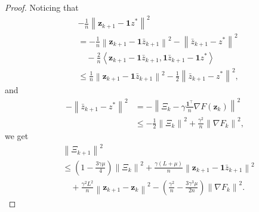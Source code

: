 \documentclass[letterpaper, 10 pt, conference]{ieeeconf}
\begin{document}
\begin{proof}
Noticing that 
\begin{equation*}
\begin{aligned}
&-\frac{1}{n}\left\| \mathbf{z}_{k+1}-\mathbf{1}z^* \right\| ^2
\\
&=-\frac{1}{n}\left\| \mathbf{z}_{k+1}-\mathbf{1}\bar{z}_{k+1} \right\| ^2-\left\| \bar{z}_{k+1}-z^* \right\| ^2
\\
&\quad -\frac{2}{n}\left< \mathbf{z}_{k+1}-\mathbf{1}\bar{z}_{k+1},\mathbf{1}\bar{z}_{k+1}-\mathbf{1}z^* \right> 
\\
&\leqslant \frac{1}{n}\left\| \mathbf{z}_{k+1}-\mathbf{1}\bar{z}_{k+1} \right\| ^2-\frac{1}{2}\left\| \bar{z}_{k+1}-z^* \right\| ^2,
\end{aligned}
\end{equation*}
and
\begin{equation*}
\begin{aligned}
-\left\| \bar{z}_{k+1}-z^* \right\| ^2
&=-\left\| \varXi _k-\gamma \frac{\mathbf{1}^{\top}}{n}\nabla F\left( \mathbf{z}_k \right) \right\| ^2
\\
&\leqslant -\frac{1}{2}\left\| \varXi _k \right\| ^2+\frac{\gamma ^2}{n}\left\| \nabla F_k \right\| ^2,
\end{aligned}
\end{equation*}
we get
\begin{equation*}
\begin{aligned}
&\left\| \varXi _{k+1} \right\| ^2
\\
&\leqslant \left( 1-\frac{3\gamma \mu}{4} \right) \left\| \varXi _k \right\| ^2+\frac{\gamma \left( L+\mu \right)}{n}\left\| \mathbf{z}_{k+1}-\mathbf{1}\bar{z}_{k+1} \right\| ^2
\\
&\quad+\frac{\gamma ^2L^2}{n}\left\| \mathbf{z}_{k+1}-\mathbf{z}_k \right\| ^2-\left( \frac{\gamma ^2}{n}-\frac{3\gamma ^3\mu}{2n} \right) \left\| \nabla F_k \right\| ^2.
\end{aligned}
\end{equation*}


\end{proof}
\end{document}
